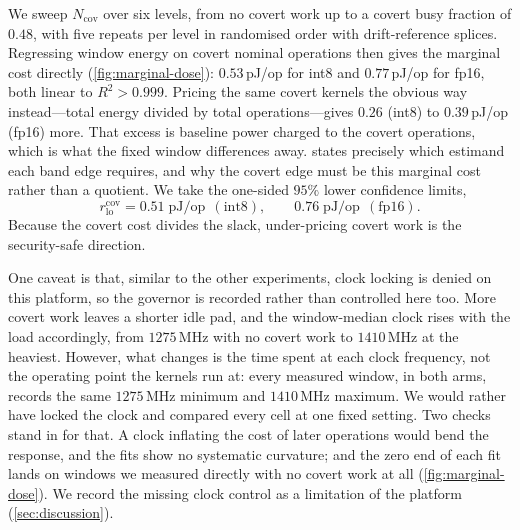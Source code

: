 \documentclass{article}
\theoremstyle{plain}
\theoremstyle{definition}
\theoremstyle{remark}
\begin{document}
We sweep $N_{\mathrm{cov}}$ over six levels, from no covert work up to a covert
busy fraction of $0.48$, with five repeats per level in randomised order with
drift-reference splices. Regressing window energy on covert nominal operations
then gives the marginal cost directly (\cref{fig:marginal-dose}):
$0.53$\,pJ/op for int8 and $0.77$\,pJ/op for fp16, both linear to
$R^2 > 0.999$. Pricing the same covert kernels the obvious way instead---total
energy divided by total operations---gives $0.26$ (int8) to $0.39$\,pJ/op
(fp16) more. That excess is baseline power charged to the covert operations,
which is what the fixed window differences away.  states
precisely which estimand each band edge requires, and why the covert edge
must be this marginal cost rather than a quotient. We take the one-sided $95\%$ lower confidence limits,
\begin{equation}
	r_{\mathrm{lo}}^{\mathrm{cov}} = 0.51\;\mathrm{pJ/op}\ \ (\text{int8}),
	\qquad
	0.76\;\mathrm{pJ/op}\ \ (\text{fp16}).
	\label{eq:measuredcov}
\end{equation}
Because the covert cost divides the slack, under-pricing covert work
is the security-safe direction. 

One caveat is that, similar to the other experiments, clock locking is denied on this platform, so the governor is
recorded rather than controlled here too. More covert work leaves a shorter
idle pad, and the window-median clock rises with the load accordingly, from
$1275$\,MHz with no covert work to $1410$\,MHz at the heaviest. However, what changes is
the time spent at each clock frequency, not the operating point the kernels run at:
every measured window, in both arms, records the same $1275$\,MHz minimum and
$1410$\,MHz maximum. We would rather have locked the clock and compared every cell at one
fixed setting. Two checks stand in for that. A clock inflating the cost of
later operations would bend the response, and the fits show no systematic
curvature; and the zero end of each fit lands on windows we measured directly
with no covert work at all (\cref{fig:marginal-dose}). We record the missing
clock control as a limitation of the platform (\cref{sec:discussion}).
\end{document}
